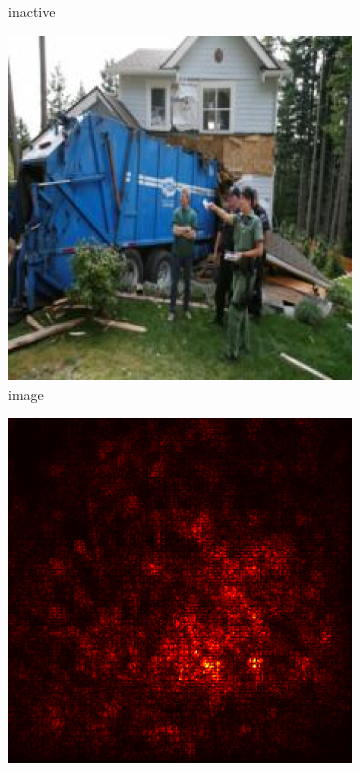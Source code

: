 \documentclass[preprint,12pt]{elsarticle}
\begin{document}
\begin{figure}
\begin{subfigure}{0.14\textwidth}
        \caption{inactive}
    \end{subfigure}
    \begin{subfigure}{0.14\linewidth}
        \centering
        \includegraphics[width=\linewidth]{../visualizations/examples/imagenette/resnet18/images/1.png}
        \caption{image}
    \end{subfigure}
    \hfill
    \begin{subfigure}{0.14\linewidth}
        \centering
        \includegraphics[width=\linewidth]{../visualizations/examples/imagenette/resnet18/saliency_map/1.png}

\end{subfigure}
\end{figure}
\end{document}
